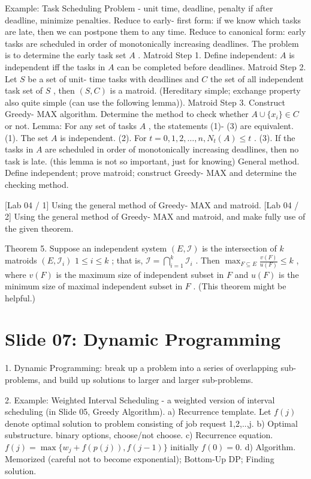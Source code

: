 \documentclass[10pt,a4paper]{article}
\begin{document}
Example: Task Scheduling Problem - unit time, deadline, penalty if after deadline, minimize penalties.
Reduce to early- first form: if we know which tasks are late, then we can postpone them to any time.
Reduce to canonical form: early tasks are scheduled in order of monotonically increasing deadlines.
The problem is to determine the early task set \(A\) .
Matroid Step 1. Define independent: \(A\) is independent iff the tasks in \(A\) can be completed before deadlines.
Matroid Step 2. Let \(S\) be a set of unit- time tasks with deadlines and \(C\) the set of all independent task set of \(S\) , then \((S,C)\) is a matroid. (Hereditary simple; exchange property also quite simple (can use the following lemma)).
Matroid Step 3. Construct Greedy- MAX algorithm. Determine the method to check whether \(A\cup \{x_{i}\} \in C\) or not.
Lemma: For any set of tasks \(A\) , the statements (1)- (3) are equivalent.
(1). The set \(A\) is independent.
(2). For \(t = 0,1,2,\dots ,n,N_{t}(A)\leq t\) .
(3). If the tasks in \(A\) are scheduled in order of monotonically increasing deadlines, then no task is late.
(this lemma is not so important, just for knowing)
General method. Define independent; prove matroid; construct Greedy- MAX and determine the checking method.

[Lab 04 / 1] Using the general method of Greedy- MAX and matroid.
[Lab 04 / 2] Using the general method of Greedy- MAX and matroid, and make fully use of the given theorem.

Theorem 5. Suppose an independent system \((E,\mathcal{I})\) is the intersection of \(k\) matroids \((E,\mathcal{I}_i)\) \(1\leq i\leq k\) ; that is, \(\mathcal{I} = \bigcap_{i = 1}^{k}\mathcal{I}_{i}\) . Then \(\max_{F\subseteq E}\frac{v(F)}{u(F)}\leq k\) , where \(v(F)\) is the maximum size of independent subset in \(F\) and \(u(F)\) is the minimum size of maximal independent subset in \(F\) .
(This theorem might be helpful.)

\section*{Slide 07: Dynamic Programming}

1. Dynamic Programming: break up a problem into a series of overlapping sub-problems, and build up solutions to larger and larger sub-problems.

2. Example: Weighted Interval Scheduling - a weighted version of interval scheduling (in Slide 05, Greedy Algorithm).
a) Recurrence template. Let \(f(j)\) denote optimal solution to problem consisting of job request 1,2,..,j.
b) Optimal substructure. binary options, choose/not choose.
c) Recurrence equation. \(f(j) = \max \{w_j + f(p(j)), f(j - 1)\}\) initially \(f(0) = 0\).
d) Algorithm. Memorized (careful not to become exponential); Bottom-Up DP; Finding solution.
\end{document}
